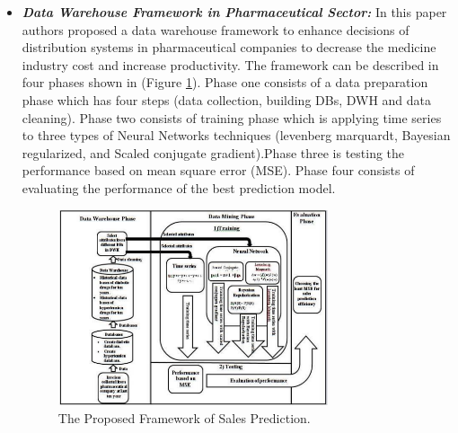 \begin{itemize}
    \item \textbf{\textit{Data Warehouse Framework in Pharmaceutical Sector:}} In this paper\cite{abd2019proposed} authors proposed a data warehouse framework to enhance decisions of distribution systems in pharmaceutical companies to decrease the medicine industry cost and increase productivity. The framework can be described in four phases shown in (Figure \ref{fig:pharmacysystem}). Phase one consists of a data preparation phase which has four steps (data collection, building DBs, DWH and data cleaning). Phase two consists of training phase which is applying time series to three types of Neural Networks techniques (levenberg marquardt, Bayesian regularized, and Scaled conjugate gradient).Phase three is testing the performance based on mean square error (MSE). Phase four consists of evaluating the performance of the best prediction model.
    \begin{figure}[h!]
      \center
      \includegraphics[width=0.75\textwidth]{images/chapter3/pharmacysystem.PNG}
      \caption{The Proposed Framework of Sales Prediction.}
      \label{fig:pharmacysystem}
    \end{figure}
    

\end{itemize}

